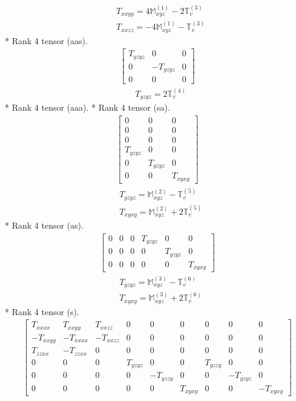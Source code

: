 \documentclass[fleqn,8pt,landscape]{jsarticle}
\begin{document}
\begin{align*}
& T_{xxyy} = 4 \mathbb{M}_{xyz}^{(1)} - 2 \mathbb{T}_{v}^{(3)} \\
& T_{xxzz} = - 4 \mathbb{M}_{xyz}^{(1)} - \mathbb{T}_{v}^{(3)}
\end{align*}
* Rank 4 tensor (aas).
\begin{align*}
\begin{bmatrix} T_{yzyz} & 0 & 0 \\ 0 & - T_{yzyz} & 0 \\ 0 & 0 & 0 \end{bmatrix}
\end{align*}
\begin{align*}
& T_{yzyz} = 2 \mathbb{T}_{v}^{(4)}
\end{align*}
* Rank 4 tensor (aaa).
* Rank 4 tensor (sa).
\begin{align*}
\begin{bmatrix} 0 & 0 & 0 \\ 0 & 0 & 0 \\ 0 & 0 & 0 \\ T_{yzyz} & 0 & 0 \\ 0 & T_{yzyz} & 0 \\ 0 & 0 & T_{xyxy} \end{bmatrix}
\end{align*}
\begin{align*}
& T_{yzyz} = \mathbb{M}_{xyz}^{(2)} - \mathbb{T}_{v}^{(5)} \\
& T_{xyxy} = \mathbb{M}_{xyz}^{(2)} + 2 \mathbb{T}_{v}^{(5)}
\end{align*}
* Rank 4 tensor (as).
\begin{align*}
\begin{bmatrix} 0 & 0 & 0 & T_{yzyz} & 0 & 0 \\ 0 & 0 & 0 & 0 & T_{yzyz} & 0 \\ 0 & 0 & 0 & 0 & 0 & T_{xyxy} \end{bmatrix}
\end{align*}
\begin{align*}
& T_{yzyz} = \mathbb{M}_{xyz}^{(3)} - \mathbb{T}_{v}^{(6)} \\
& T_{xyxy} = \mathbb{M}_{xyz}^{(3)} + 2 \mathbb{T}_{v}^{(6)}
\end{align*}
* Rank 4 tensor (s).
\begin{align*}
\begin{bmatrix} T_{xxxx} & T_{xxyy} & T_{xxzz} & 0 & 0 & 0 & 0 & 0 & 0 \\ - T_{xxyy} & - T_{xxxx} & - T_{xxzz} & 0 & 0 & 0 & 0 & 0 & 0 \\ T_{zzxx} & - T_{zzxx} & 0 & 0 & 0 & 0 & 0 & 0 & 0 \\ 0 & 0 & 0 & T_{yzyz} & 0 & 0 & T_{yzzy} & 0 & 0 \\ 0 & 0 & 0 & 0 & - T_{yzzy} & 0 & 0 & - T_{yzyz} & 0 \\ 0 & 0 & 0 & 0 & 0 & T_{xyxy} & 0 & 0 & - T_{xyxy} \end{bmatrix}
\end{align*}
\end{document}
